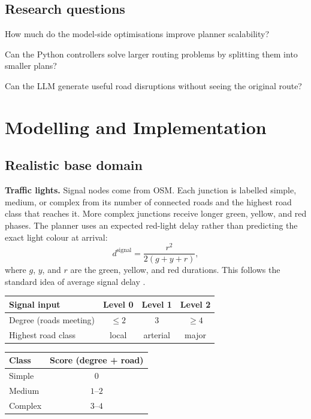 \documentclass[10pt]{article}
\begin{document}
\subsection{Research questions}
\begin{description}[leftmargin=1.05cm,labelwidth=0.85cm,itemsep=0.10em,topsep=0.05em]

  \item[\textbf{RQ1}] How much do the model-side optimisations improve planner scalability?

  \item[\textbf{RQ2}] Can the Python controllers solve larger routing problems by splitting them into smaller plans?

  \item[\textbf{RQ3}] Can the LLM generate useful road disruptions without seeing the original route?

\end{description}

\section{Modelling and Implementation}

\subsection{Realistic base domain}
\textbf{Traffic lights.} Signal nodes come from OSM. Each junction is labelled simple, medium, or complex from its number
of connected roads and the highest road class that reaches it. More complex
junctions receive longer green, yellow, and red phases. The planner uses an
expected red-light delay rather than predicting the exact light colour at
arrival:
\[
 d^{\mathrm{signal}}=\frac{r^2}{2(g+y+r)},
\]
where $g$, $y$, and $r$ are the green, yellow, and red durations. This follows
the standard idea of average signal delay \cite{webster1958}.

\begin{center}
\small
\begin{tabular}{@{}lccc@{}}
\toprule
Signal input & Level 0 & Level 1 & Level 2 \\
\midrule
Degree (roads meeting) & $\leq 2$ & $3$ & $\geq 4$ \\
Highest road class & local & arterial & major \\
\bottomrule
\end{tabular}
\qquad
\begin{tabular}{@{}lc@{}}
\toprule
Class & Score (degree + road) \\
\midrule
Simple & $0$ \\
Medium & $1$–$2$ \\
Complex & $3$–$4$ \\
\bottomrule
\end{tabular}
\end{center}
\end{document}
